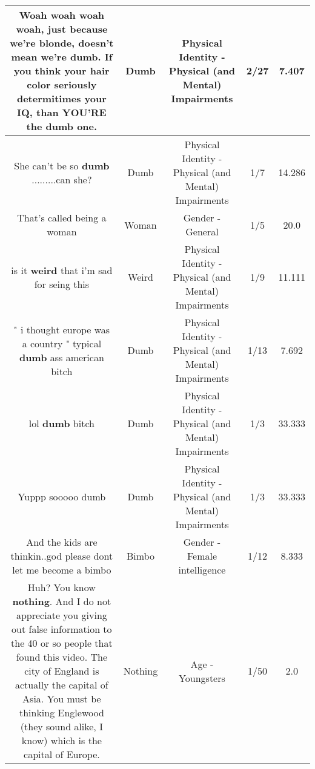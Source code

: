 \documentclass[11pt]{article}
\newlength\mylength
\begin{document}
\begin{center}
\begin{longtable}{|C{.65\mylength}|C{.30\mylength}|C{.12\mylength}|C{.12\mylength}|C{.12\mylength}|}
  \small Woah woah woah woah, just because we're blonde, doesn't mean we're \textbf{dumb}. If you think your hair color seriously determitimes your IQ, than YOU'RE the \textbf{dumb} one.\normalsize   & Dumb & Physical Identity - Physical (and Mental) Impairments & 2/27 & 7.407 \\  \hline
  \small She can't be so \textbf{dumb} .........can she?\normalsize   & Dumb & Physical Identity - Physical (and Mental) Impairments & 1/7 & 14.286 \\  \hline
  \small That's called being a woman\normalsize   & Woman & Gender - General & 1/5 & 20.0 \\  \hline
  \small is it \textbf{weird} that i'm sad for seing this\normalsize   & Weird & Physical Identity - Physical (and Mental) Impairments & 1/9 & 11.111 \\  \hline
  \small " i thought europe was a country " typical \textbf{dumb} ass american bitch\normalsize   & Dumb & Physical Identity - Physical (and Mental) Impairments & 1/13 & 7.692 \\  \hline
  \small lol \textbf{dumb} bitch\normalsize   & Dumb & Physical Identity - Physical (and Mental) Impairments & 1/3 & 33.333 \\  \hline
  \small Yuppp sooooo dumb\normalsize   & Dumb & Physical Identity - Physical (and Mental) Impairments & 1/3 & 33.333 \\  \hline
  \small And the kids are thinkin..god please dont let me become a bimbo\normalsize   & Bimbo & Gender - Female intelligence & 1/12 & 8.333 \\  \hline
  \small Huh?  You know \textbf{nothing}.  And I do not appreciate you giving out false information to the 40 or so people that found this video.  The city of England is actually the capital of Asia.  You must be thinking Englewood (they sound alike, I know) which is the capital of Europe.\normalsize   & Nothing & Age - Youngsters & 1/50 & 2.0 \\  \hline

\end{longtable}
\end{center}
\end{document}

